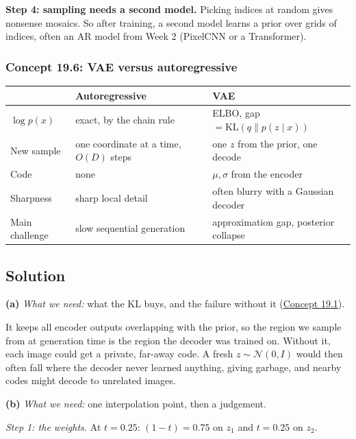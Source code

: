 \documentclass[12pt,a4paper]{article}
\begin{document}
\textbf{Step 4: sampling needs a second model.} Picking indices at random gives nonsense mosaics. So after training, a second model learns a prior over grids of indices, often an AR model from Week 2 (PixelCNN or a Transformer).

\subsubsection{Concept 19.6: VAE versus autoregressive}\label{c19-6}

\begin{center}
\begin{tabular}{@{}>{\raggedright\arraybackslash}p{}>{\raggedright\arraybackslash}p{}>{\raggedright\arraybackslash}p{}@{}}
\toprule
 & Autoregressive & VAE \\
\midrule
$\log p(x)$ & exact, by the chain rule & ELBO, gap $=\mathrm{KL}(q\|p(z\mid x))$ \\
New sample & one coordinate at a time, $O(D)$ steps & one $z$ from the prior, one decode \\
Code & none & $\mu,\sigma$ from the encoder \\
Sharpness & sharp local detail & often blurry with a Gaussian decoder \\
Main challenge & slow sequential generation & approximation gap, posterior collapse \\
\bottomrule
\end{tabular}
\end{center}

\subsection{Solution}

\textbf{(a)} \emph{What we need:} what the KL buys, and the failure without it (\hyperref[c19-1]{Concept 19.1}).

It keeps all encoder outputs overlapping with the prior, so the region we sample from at generation time is the region the decoder was trained on. Without it, each image could get a private, far-away code. A fresh $z\sim\mathcal{N}(0,I)$ would then often fall where the decoder never learned anything, giving garbage, and nearby codes might decode to unrelated images.

\textbf{(b)} \emph{What we need:} one interpolation point, then a judgement.

\emph{Step 1: the weights.} At $t=0.25$: $(1-t)=0.75$ on $z_1$ and $t=0.25$ on $z_2$.
\end{document}
